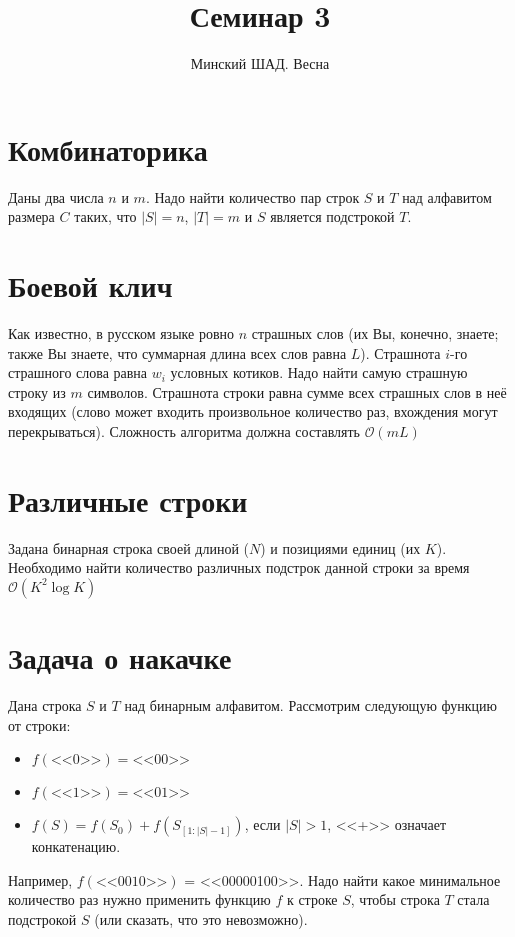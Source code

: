 \documentclass[addpoints]{exam}
\title{Семинар 3}
\author{Минский ШАД. Весна}
\begin{document}
\maketitle

\section{Комбинаторика}

Даны два числа $n$ и $m$. Надо найти количество пар строк $S$ и $T$ над алфавитом размера $C$ таких, что $|S| = n$, $|T| = m$ и $S$ является подстрокой $T$.

\section{Боевой клич}

Как известно, в русском языке ровно $n$ страшных слов (их Вы, конечно, знаете; также Вы знаете, что суммарная длина всех слов равна $L$). Страшнота $i$-го страшного слова равна $w_i$ условных котиков. Надо найти самую страшную строку из $m$ символов. Страшнота строки равна сумме всех страшных слов в неё входящих (слово может входить произвольное количество раз, вхождения могут перекрываться). Сложность алгоритма должна составлять $\mathcal{O}(mL)$

\section{Различные строки}

Задана бинарная строка своей длиной ($N$) и позициями единиц (их $K$). Необходимо найти количество различных подстрок данной строки за время $\mathcal{O}(K^2 \log{K})$

\section{Задача о накачке}

Дана строка $S$ и $T$ над бинарным алфавитом. Рассмотрим следующую функцию от строки:

\begin{itemize}
\item $f(\mbox{<<0>>}) = \mbox{<<00>>}$
\item $f(\mbox{<<1>>}) = \mbox{<<01>>}$
\item $f(S) = f(S_0) + f(S_{[1:|S| - 1]})$, если $|S| > 1$, <<+>> означает конкатенацию.
\end{itemize}

Например, $f(\mbox{<<0010>>})$ = <<00000100>>. Надо найти какое минимальное количество раз нужно применить функцию $f$ к строке $S$, чтобы строка $T$ стала подстрокой $S$ (или сказать, что это невозможно).
\end{document}
